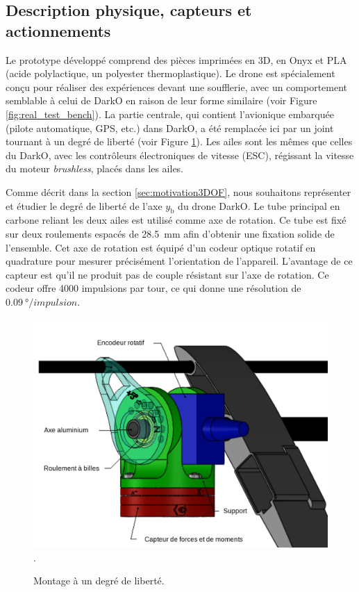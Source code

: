\subsection{Description physique, capteurs et actionnements}
Le prototype développé comprend des pièces imprimées en 3D, en Onyx et PLA   (acide polylactique, un polyester thermoplastique). Le drone est spécialement conçu pour réaliser des expériences devant une soufflerie, avec un comportement semblable à celui de DarkO en raison de leur forme similaire (voir Figure \ref{fig:real_test_bench}). La partie centrale, qui contient l'avionique embarquée (pilote automatique, GPS, etc.) dans DarkO, a été remplacée ici par un joint tournant à un degré de liberté (voir Figure \ref{fig:rotation}). Les ailes sont les mêmes que celles du DarkO, avec les contrôleurs électroniques de vitesse (ESC), régissant la vitesse du moteur \textit{brushless}, placés dans les ailes.

Comme décrit dans la section \ref{sec:motivation3DOF}, nous souhaitons représenter et étudier le degré de liberté de l'axe $y_{\text{b}}$ du drone DarkO. Le tube principal en carbone reliant les deux ailes est utilisé comme axe de rotation. Ce tube est fixé sur deux roulements espacés de \SI{28.5}{\milli\meter} afin d'obtenir une fixation solide de l'ensemble. Cet axe de rotation est équipé d'un codeur optique rotatif en quadrature pour mesurer précisément l'orientation de l'appareil. L'avantage de ce capteur est qu'il ne produit pas de couple résistant sur l'axe de rotation. Ce codeur offre 4000 impulsions par tour, ce qui donne une résolution de $\SI{0.09}{\degree}/impulsion$.

\begin{figure}[H]
    \centering
    \includegraphics[width=0.6\columnwidth]{figures/MontageSupport2.png}.
    \caption{Montage à un degré de liberté.}
    \label{fig:rotation}
\end{figure} 

